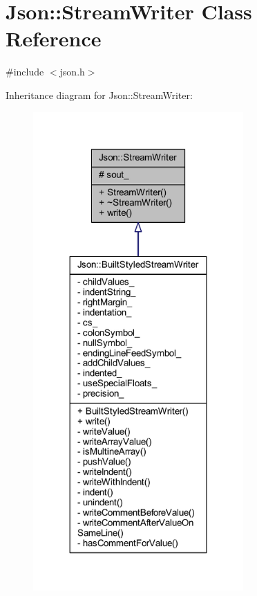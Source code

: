 \hypertarget{class_json_1_1_stream_writer}{}\section{Json\+:\+:Stream\+Writer Class Reference}
\label{class_json_1_1_stream_writer}


{\ttfamily \#include $<$json.\+h$>$}



Inheritance diagram for Json\+:\+:Stream\+Writer\+:\nopagebreak
\begin{figure}[H]
\begin{center}
\leavevmode
\includegraphics[width=228pt]{class_json_1_1_stream_writer__inherit__graph}
\end{center}
\end{figure}


